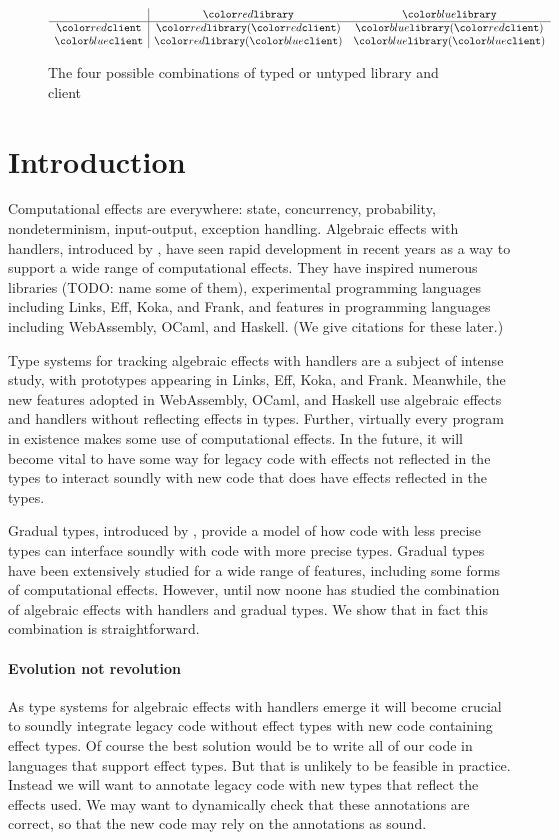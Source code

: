 \begin{figure}
$$
\begin{array}{c|cc}
  & \dhandler & \shandler \\
  \hline
  \dclient & \dhandler(\dclient) & \shandler(\dclient) \\
  \sclient & \dhandler(\sclient) & \shandler(\sclient)
\end{array}
$$
\caption{The four possible combinations of typed or untyped library and client}
\label{fig:migration-example}
\end{figure}

\section{Introduction}

Computational effects are everywhere: state, concurrency, probability,
nondeterminism, input-output, exception handling. Algebraic effects with handlers,
introduced by \citet{plotkin-pretnar-2009},
have seen rapid development in recent years as a way to support a wide range
of computational effects. They have inspired numerous libraries (TODO: name some of them), experimental
programming languages including Links, Eff, Koka, and Frank, and features
in programming languages including WebAssembly, OCaml, and Haskell.
(We give citations for these later.)

Type systems for tracking algebraic effects with handlers are a subject of intense study,
with prototypes appearing in Links, Eff, Koka, and Frank.
Meanwhile, the new features adopted in WebAssembly, OCaml, and Haskell
use algebraic effects and handlers without reflecting effects in types.
Further, virtually every program in existence makes some use of computational
effects. In the future, it will become vital to have some way for legacy
code with effects not reflected in the types to interact soundly with
new code that does have effects reflected in the types.

Gradual types, introduced by \citet{siek-taha-2006},
provide a model of how code with less precise types can interface soundly with
code with more precise types. Gradual types have been extensively studied for a wide
range of features, including some forms of computational effects. However,
until now noone has studied the combination of algebraic effects
with handlers and gradual types. We show that in fact this combination
is straightforward.

\paragraph{Evolution not revolution}
As type systems for algebraic effects with handlers emerge
it will become crucial to soundly integrate legacy code without effect types
with new code containing effect types. Of course the best solution would be
to write all of our code in languages that support effect types.
But that is unlikely to be feasible in practice.
Instead we will want to annotate legacy code with new types that reflect
the effects used. We may want to dynamically check that these annotations
are correct, so that the new code may rely on the annotations as sound.

